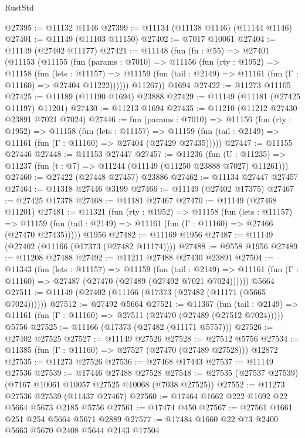 \begin{lexlean}{RustStd}
\begin{coremodule}
@27395 := @11132 @1146
@27399 := @11134 (@11138 @1146) (@11144 @1146)
@27401 := @11149 (@11103 @11150)
@27402 := @7017 @10061
@27404 := @11149 (@27402 @11177)
@27421 := @11148
    (fun (fn : @55) =>
    @27401
      (@11153
        (@11155
          (fun (params : @7010) =>
          @11156
            (fun (rty : @1952) =>
            @11158
              (fun (lets : @11157) =>
              @11159 (fun (tail : @2149) => @11161 (fun (Γ : @11160) => @27404 @11222))))))
        @11267))
    @1694
@27422 := @11273 @11105
@27425 := @11189 (@11190 @1694) @23888
@27429 := @11149 (@11181 (@27425 @11197) @11201)
@27430 := @11213 @1694
@27435 := @11210 (@11212 @27430 @23891 @7021 @7024)
@27446 := fun (params : @7010) =>
  @11156
    (fun (rty : @1952) =>
    @11158
      (fun (lets : @11157) =>
      @11159 (fun (tail : @2149) => @11161 (fun (Γ : @11160) => @27404 (@27429 @27435)))))
@27447 := @11155 @27446
@27448 := @11153 @27447
@27457 := @11236
    (fun (U : @11235) => @11237 (fun (t : @7) => @11244 (@11149 (@11250 @23888 @7027) @11261)))
@27460 := @27422 (@27448 @27457) @23886
@27462 := @11134 @27447 @27457
@27464 := @11318 @27446 @3199
@27466 := @11149 (@27402 @17375)
@27467 := @27425 @17378
@27468 := @11181 @27467
@27470 := @11149 (@27468 @11201)
@27481 := @11321
    (fun (rty : @1952) =>
    @11158
      (fun (lets : @11157) =>
      @11159 (fun (tail : @2149) => @11161 (fun (Γ : @11160) => @27466 (@27470 @27435)))))
    @1956
@27482 := @11169 @1956
@27487 := @11149 (@27402 (@11166 (@17373 (@27482 @11174))))
@27488 := @9558 @1956
@27489 := @11208 @27488
@27492 := @11211 @27488 @27430 @23891
@27504 := @11343
    (fun (lets : @11157) =>
    @11159
      (fun (tail : @2149) =>
      @11161 (fun (Γ : @11160) => @27487 (@27470 (@27489 (@27492 @7021 @7024))))))
    @5664
@27511 := @11149 (@27402 (@11166 (@17373 (@27482 (@11171 (@5665 @7024))))))
@27512 := @27492 @5664
@27521 := @11367
    (fun (tail : @2149) => @11161 (fun (Γ : @11160) => @27511 (@27470 (@27489 (@27512 @7024)))))
    @5756
@27525 := @11166 (@17373 (@27482 (@11171 @5757)))
@27526 := @27402 @27525
@27527 := @11149 @27526
@27528 := @27512 @5756
@27534 := @11385 (fun (Γ : @11160) => @27527 (@27470 (@27489 @27528))) @12872
@27535 := @11273 @27526
@27536 := @27468 @17443
@27537 := @11149 @27536
@27539 := @17446 @27488 @27528
@27548 := @27535 (@27537 @27539) (@7167 @10061 @10057 @27525 @10068 (@7038 @27525))
@27552 := @11273 @27536 @27539 (@11437 @27467)
@27560 := @17464 @1662 @222 @1692 @22 @5664 @5673 @2185 @5756
@27561 := @17474 @450
@27567 := @27561 @1661 @251 @254 @5664 @5671 @2889
@27577 := @17484 @1660 @22 @73 @2400 @5663 @5670 @2408 @5644 @2143 @17504

\end{coremodule}
\end{lexlean}
